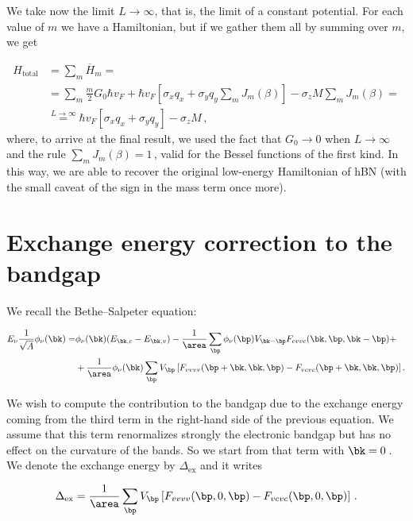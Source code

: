 We take now the limit $L \to \infty$, that is, the limit of a constant potential.
For each value of $m$ we have a Hamiltonian, but if we gather them all by summing over $m$, we get

\begin{align}
H_{\text{total}} &= 
\sum_{m} \overline{H}_{m} = 
\nonumber\\
&= \sum_{m} \frac{m}{2} G_{0} \hbar v_{F} +
\hbar v_{F} [\sigma_{x}q_{x}+\sigma_{y} q_{y} \sum_{m}J_{m}(\beta)] -
\sigma_{z} M \sum_{m} J_{m}(\beta) = 
\nonumber\\
& \overset{L\to \infty}{=} \hbar v_{F}
[\sigma_{x}q_{x}+\sigma_{y}q_{y}] - \sigma_{z}M\,,
\end{align}
%
\noindent where, to arrive at the final result, we used the fact that $G_0 \to 0$ when $L \to \infty$ and the rule $\sum_{m} J_{m}(\beta) = 1$\,, valid for the Bessel functions of the first kind.
In this way, we are able to recover the original low-energy Hamiltonian of hBN (with the small caveat of the sign in the mass term once more).

\section{Exchange energy correction to the bandgap}
\label{sec:exchange_energy}

We recall the Bethe--Salpeter equation:

\begin{equation}
    \begin{split}
        E_\nu \frac{1}{\sqrt{A}} \phi_\nu(\bk)  =&   \phi_{\nu}(\bk) (E_{\bk,c}-E_{\bk,v}) - \frac{1}{\area} \sum_{\bp} \phi_{\nu} (\bp) V_{\bk-\bp} F_{cvvc}(\bk,\bp,\bk-\bp) +  \\
        & + \frac{1}{\area} \phi_{\nu}(\bk) \sum_{\bp} V_{\bp} \left[F_{vvvv}(\bp + \bk ,\bk,\bp) - F_{vcvc}(\bp + \bk,\bk,\bp) \right].
    \end{split}
\end{equation}

\noindent We wish to compute the contribution to the bandgap due to the exchange energy coming from the third term in the right-hand side of the previous equation.
We assume that this term renormalizes strongly the electronic bandgap but has no effect on the curvature of the bands.
So we start from that term with $\bk = 0$\,.
We denote the exchange energy by $\Delta_{\mathrm{ex}}$ and it writes

\begin{equation}
    \Delta_{\mathrm{ex}} = \frac{1}{\area} \sum_{\bp} V_{\bp} \left[F_{vvvv}(\bp ,0,\bp) - F_{vcvc}(\bp,0,\bp) \right] \,.
\end{equation}

